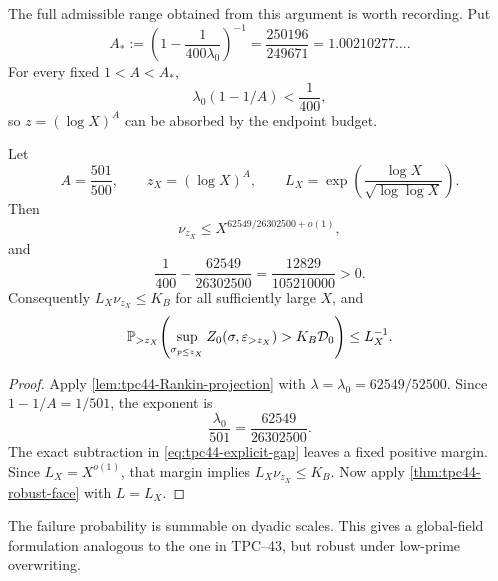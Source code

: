 The full admissible range obtained from this argument is worth
recording.  Put
\begin{equation}
 A_*:=
 \left(1-\frac{1}{400\lambda_0}\right)^{-1}
 =\frac{250196}{249671}
 =1.00210277\ldots.
 \label{eq:tpc44-A-star}
\end{equation}
For every fixed \(1<A<A_*\),
\begin{equation}
 \lambda_0(1-1/A)<\frac1{400},
 \label{eq:tpc44-A-range-gap}
\end{equation}
so \(z=(\log X)^A\) can be absorbed by the endpoint budget.

\begin{theorem}
\label{thm:tpc44-quantitative-freezing}
Let
\begin{equation}
 A=\frac{501}{500},
 \qquad z_X=(\log X)^A,
 \qquad
 L_X=\exp\!\left(\frac{\log X}{\sqrt{\log\log X}}\right).
 \label{eq:tpc44-explicit-parameters}
\end{equation}
Then
\begin{equation}
 \nu_{z_X}
 \le X^{62549/26302500+o(1)},
 \label{eq:tpc44-explicit-nu}
\end{equation}
and
\begin{equation}
 \frac1{400}-\frac{62549}{26302500}
 =\frac{12829}{105210000}>0.
 \label{eq:tpc44-explicit-gap}
\end{equation}
Consequently \(L_X\nu_{z_X}\le K_B\) for all sufficiently large \(X\),
and
\begin{equation}
 \mathbb P_{>z_X}\!\left(
  \sup_{\sigma_{p\le z_X}}
  Z_0(\sigma,\varepsilon_{>z_X})
  >K_B\mathcal D_0
 \right)
 \le L_X^{-1}.
 \label{eq:tpc44-explicit-freezing-tail}
\end{equation}
\end{theorem}

\begin{proof}
Apply \cref{lem:tpc44-Rankin-projection} with
\(
 \lambda=\lambda_0=62549/52500
\).
Since \(1-1/A=1/501\), the exponent is
\begin{equation}
 \frac{\lambda_0}{501}
 =\frac{62549}{26302500}.
 \label{eq:tpc44-explicit-exponent-computation}
\end{equation}
The exact subtraction in \eqref{eq:tpc44-explicit-gap} leaves a fixed
positive margin.  Since \(L_X=X^{o(1)}\), that margin implies
\(L_X\nu_{z_X}\le K_B\).  Now apply
\cref{thm:tpc44-robust-face} with \(L=L_X\).
\end{proof}

The failure probability is summable on dyadic scales.  This gives a
global-field formulation analogous to the one in TPC--43, but robust
under low-prime overwriting.

